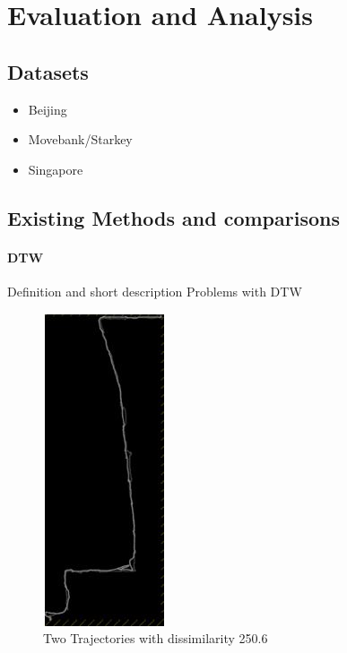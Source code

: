 \section{Evaluation and Analysis}

\subsection{Datasets}
\begin{itemize}
\item Beijing
\item Movebank/Starkey
\item Singapore
\end{itemize}

\subsection{Existing Methods and comparisons} 

\paragraph{DTW}
\par Definition and short description
Problems with DTW
\begin{figure}
\centering     
\includegraphics[scale=0.8]{figs/dtw_probs_1_1.jpg}
\caption{Two Trajectories with dissimilarity 250.6}
\label{fig:dtw_prob_1}  
\end{figure} 

